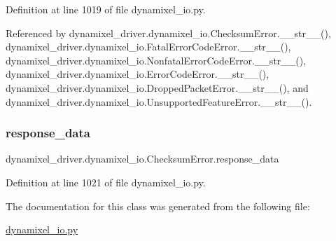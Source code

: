 Definition at line 1019 of file dynamixel\+\_\+io.\+py.



Referenced by dynamixel\+\_\+driver.\+dynamixel\+\_\+io.\+Checksum\+Error.\+\_\+\+\_\+str\+\_\+\+\_\+(), dynamixel\+\_\+driver.\+dynamixel\+\_\+io.\+Fatal\+Error\+Code\+Error.\+\_\+\+\_\+str\+\_\+\+\_\+(), dynamixel\+\_\+driver.\+dynamixel\+\_\+io.\+Nonfatal\+Error\+Code\+Error.\+\_\+\+\_\+str\+\_\+\+\_\+(), dynamixel\+\_\+driver.\+dynamixel\+\_\+io.\+Error\+Code\+Error.\+\_\+\+\_\+str\+\_\+\+\_\+(), dynamixel\+\_\+driver.\+dynamixel\+\_\+io.\+Dropped\+Packet\+Error.\+\_\+\+\_\+str\+\_\+\+\_\+(), and dynamixel\+\_\+driver.\+dynamixel\+\_\+io.\+Unsupported\+Feature\+Error.\+\_\+\+\_\+str\+\_\+\+\_\+().

\mbox{\label{classdynamixel__driver_1_1dynamixel__io_1_1_checksum_error_a5538e10d0a8ce03b332fd7a6f6849380}} 
\subsubsection{\texorpdfstring{response\+\_\+data}{response\_data}}
{\footnotesize\ttfamily dynamixel\+\_\+driver.\+dynamixel\+\_\+io.\+Checksum\+Error.\+response\+\_\+data}



Definition at line 1021 of file dynamixel\+\_\+io.\+py.



The documentation for this class was generated from the following file\+:\begin{DoxyCompactItemize}
\item 
\hyperlink{dynamixel__io_8py}{dynamixel\+\_\+io.\+py}\end{DoxyCompactItemize}

